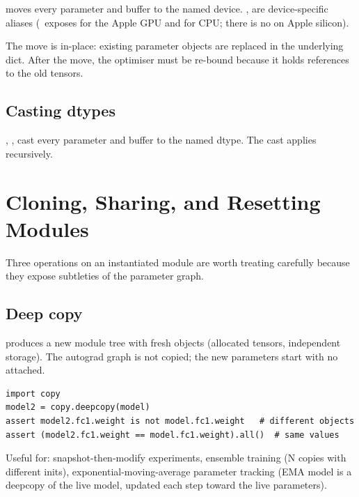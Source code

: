  moves every parameter and buffer to the
named device. ,  are
device-specific aliases (\Lucid\ exposes  for
the Apple GPU and  for CPU; there is no
 on Apple silicon).

The move is in-place: existing parameter  objects are
replaced in the underlying dict. After the move, the optimiser
must be re-bound because it holds references to the old tensors.

\subsection{Casting dtypes}
\label{ssec:module_system:dtype_cast}

, , 
cast every parameter and buffer to the named dtype. The cast
applies recursively.

\section{Cloning, Sharing, and Resetting Modules}
\label{sec:module_system:cloning}

Three operations on an instantiated module are worth treating
carefully because they expose subtleties of the parameter graph.

\subsection{Deep copy}
\label{ssec:module_system:deep_copy}

 produces a new module tree with
fresh  objects (allocated tensors, independent
storage). The autograd graph is not copied; the new parameters
start with no  attached.

\begin{lstlisting}[style=lucid,language=LucidPython]
import copy
model2 = copy.deepcopy(model)
assert model2.fc1.weight is not model.fc1.weight   # different objects
assert (model2.fc1.weight == model.fc1.weight).all()  # same values
\end{lstlisting}

Useful for: snapshot-then-modify experiments, ensemble training
(N copies with different inits), exponential-moving-average
parameter tracking (EMA model is a deepcopy of the live model,
updated each step toward the live parameters).

